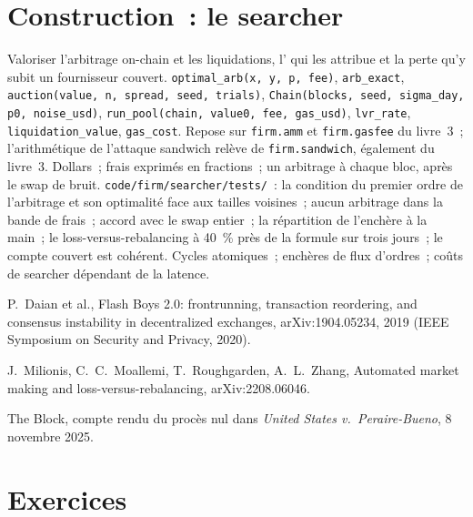 \section{Construction~: le searcher}\label{bld:hf:on-chain-trading:searcher}

\begin{build}
 Valoriser l'arbitrage on-chain et les liquidations, l' qui les attribue et la perte qu'y subit un fournisseur couvert.
 \texttt{optimal\_arb(x, y, p, fee)}, \texttt{arb\_exact}, \texttt{auction(value, n, spread, seed, trials)},
\texttt{Chain(blocks, seed, sigma\_day, p0, noise\_usd)}, \texttt{run\_pool(chain, value0, fee, gas\_usd)}, \texttt{lvr\_rate}, \texttt{liquidation\_value},
\texttt{gas\_cost}. Repose sur \texttt{firm.amm} et \texttt{firm.gasfee} du livre~3~; l'arithmétique de l'attaque sandwich relève de \texttt{firm.sandwich}, également du livre~3.
 Dollars~; frais exprimés en fractions~; un arbitrage à chaque bloc, après le swap de bruit.
 \texttt{code/firm/searcher/tests/}~: la condition du premier ordre de l'arbitrage et son optimalité face aux tailles voisines~; aucun
arbitrage dans la bande de frais~; accord avec le swap entier~; la répartition de l'enchère à la main~; le loss-versus-rebalancing à 40~\% près de la formule sur
trois jours~; le compte couvert est cohérent.
 Cycles atomiques~; enchères de flux d'ordres~; coûts de searcher dépendant de la latence.
\end{build}

\begin{omsources}
\item P.~Daian et al., Flash Boys 2.0: frontrunning, transaction reordering, and consensus instability in decentralized exchanges,
arXiv:1904.05234, 2019 (IEEE Symposium on Security and Privacy, 2020).
\item J.~Milionis, C.~C.~Moallemi, T.~Roughgarden, A.~L.~Zhang, Automated market making and loss-versus-rebalancing, arXiv:2208.06046.
\item The Block, compte rendu du procès nul dans \emph{United States v.\ Peraire-Bueno}, 8 novembre 2025.
\end{omsources}

\section{Exercices}

